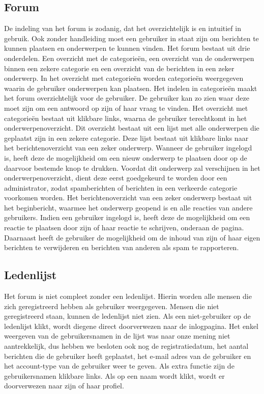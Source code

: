 \documentclass[a4paper,12pt]{article}
\begin{document}
\subsection[Forum]{Forum}
De indeling van het forum is zodanig, dat het overzichtelijk is en intuitief in gebruik. Ook zonder handleiding moet een gebruiker in staat zijn om berichten te kunnen plaatsen en onderwerpen te kunnen vinden.
Het forum bestaat uit drie onderdelen. Een overzicht met de categorie\"en, een overzicht van de onderwerpen binnen een zekere categorie en een overzicht van de berichten in een zeker onderwerp. In het overzicht met categorie\"en worden categorie\"en weergegeven waarin de gebruiker onderwerpen kan plaatsen. Het indelen in categorie\"en maakt het forum overzichtelijk voor de gebruiker. De gebruiker kan zo zien waar deze moet zijn om een antwoord op zijn of haar vraag te vinden. Het overzicht met categorie\"en bestaat uit klikbare links, waarna de gebruiker terechtkomt in het onderwerpenoverzicht. Dit overzicht bestaat uit een lijst met alle onderwerpen die geplaatst zijn in een zekere categorie. Deze lijst bestaat uit klikbare links naar het berichtenoverzicht van een zeker onderwerp. Wanneer de gebruiker ingelogd is, heeft deze de mogelijkheid om een nieuw onderwerp te plaatsen door op de daarvoor bestemde knop te drukken. Voordat dit onderwerp zal verschijnen in het onderwerpenoverzicht, dient deze eerst goedgekeurd te worden door een administrator, zodat spamberichten of berichten in een verkeerde categorie voorkomen worden. Het berichtenoverzicht van een zeker onderwerp bestaat uit het beginbericht, waarmee het onderwerp geopend is en alle reacties van andere gebruikers. Indien een gebruiker ingelogd is, heeft deze de mogelijkheid om een reactie te plaatsen door zijn of haar reactie te schrijven, onderaan de pagina. Daarnaast heeft de gebruiker de mogelijkheid om de inhoud van zijn of haar eigen berichten te verwijderen en berichten van anderen als spam te rapporteren.\\


\subsection[Ledenlijst]{Ledenlijst}
Het forum is niet compleet zonder een ledenlijst. Hierin worden alle mensen die zich geregistreerd hebben als gebruiker weergegeven. Mensen die niet geregistreerd staan, kunnen de ledenlijst niet zien. Als een niet-gebruiker op de ledenlijst klikt, wordt diegene direct doorverwezen naar de inlogpagina. Het enkel weergeven van de gebruikersnamen in de lijst was naar onze mening niet aantrekkelijk, dus hebben we besloten ook nog de registratiedatum, het aantal berichten die de gebruiker heeft geplaatst, het e-mail adres van de gebruiker en het account-type van de gebruiker weer te geven. Als extra functie zijn de gebruikersnamen klikbare links. Als op een naam wordt klikt, wordt er doorverwezen naar zijn of haar profiel. \\
\end{document}
